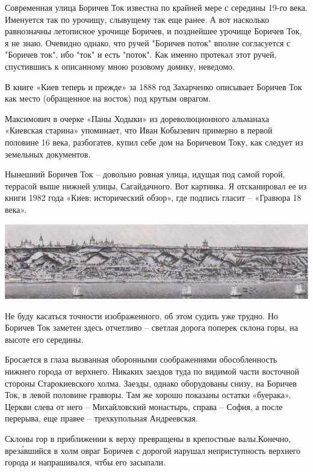 Современная улица Боричев Ток известна по крайней мере с середины 19-го века. Именуется так по урочищу, слывущему так еще ранее. А вот насколько равнозначны летописное урочище Боричев, и позднейшее урочище Боричев Ток, я не знаю. Очевидно однако, что ручей "Боричев поток" вполне согласуется с "Боричев ток", ибо "ток" и есть "поток". Как именно протекал этот ручей, спустившись к описанному мною розовому домику, неведомо.

В книге «Киев теперь и прежде» за 1888 год Захарченко описывает Боричев Ток как место (обращенное на восток) под крутым оврагом.

Максимович в очерке «Паны Ходыки» из  дореволюционного альманаха «Киевская старина» упоминает, что Иван Кобызевич примерно в первой половине 16 века, разбогатев, купил себе дом на Боричевом Току, как следует из земельных документов.

Нынешний Боричев Ток – довольно ровная улица, идущая под самой горой, террасой выше нижней улицы, Сагайдачного. Вот картинка. Я отсканировал ее из книги 1982 года «Киев: исторический обзор», где подпись гласит – «Гравюра 18 века».

\begin{center}
\includegraphics[width=\linewidth]{chast-colebanie-osnov/borichev-tok/18-vek-bor.jpg}
\end{center}

Не буду касаться точности изображенного, об этом судить уже трудно. Но Боричев Ток заметен здесь отчетливо – светлая дорога поперек склона горы, на высоте его середины.

Бросается в глаза вызванная оборонными соображениями обособленность нижнего города от верхнего. Никаких заездов туда по видимой части восточной стороны Старокиевского холма. Заезды, однако оборудованы снизу, на Боричев Ток, в левой половине гравюры. Там же хорошо показаны остатки «буерака». Церкви слева от него – Михайловский монастырь, справа – София, а после перерыва, еще правее – трехкупольная Андреевская.

Склоны гор в приближении к верху превращены в крепостные валы.Конечно, врез\'авшийся в холм овраг Боричев с дорогой нарушал неприступность верхнего города и напрашивался, чтбы его засыпали. 

